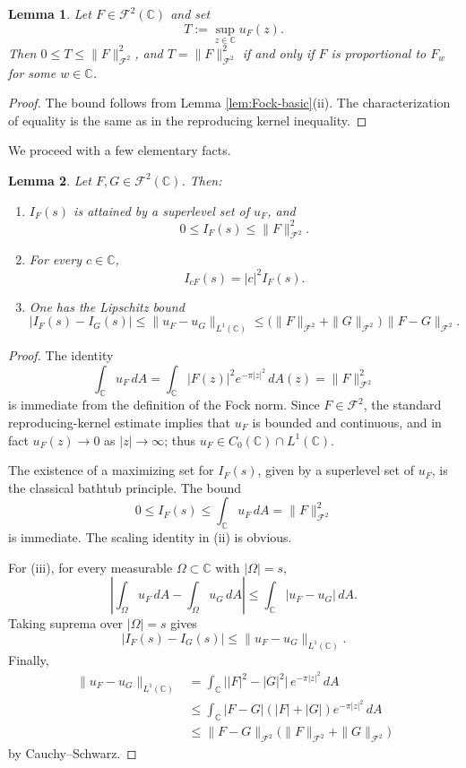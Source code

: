 \documentclass[a4paper,11pt,reqno]{amsart}
\numberwithin{equation}{section}
\theoremstyle{plain} %
\newtheorem{lemma}{Lemma}[section]
\theoremstyle{definition} %
\theoremstyle{remark}
\newcommand{\C}{\mathbb{C}}
\begin{document}
\medskip

\begin{lemma}\label{lem:max}
Let $F \in \mathcal{F}^2(\mathbb{C})$ and set
\[
T := \sup_{z \in \mathbb{C}} u_F(z).
\]
Then $0 \le T \le \|F\|_{\mathcal{F}^2}^2$, and $T = \|F\|_{\mathcal{F}^2}^2$
if and only if $F$ is proportional to $F_w$ for some $w \in \mathbb{C}$.
\end{lemma}

\begin{proof}
The bound follows from Lemma \ref{lem:Fock-basic}(ii). The characterization of
equality is the same as in the reproducing kernel inequality.
    \end{proof}

\medskip

    We proceed with a few elementary facts.

\begin{lemma}\label{lem:basic-properties-global}
Let \(F,G\in \mathcal F^2(\C)\). Then:
\begin{enumerate}
    \item[(i)] \(I_F(s)\) is attained by a superlevel set of \(u_F\), and
    \[
    0\le I_F(s)\le \|F\|_{\mathcal F^2}^2.
    \]
    \item[(ii)] For every \(c\in \C\),
    \[
    I_{cF}(s)=|c|^2 I_F(s).
    \]
    \item[(iii)] One has the Lipschitz bound
    \[
    |I_F(s)-I_G(s)|
    \le
    \|u_F-u_G\|_{L^1(\C)}
    \le
    \big(\|F\|_{\mathcal F^2}+\|G\|_{\mathcal F^2}\big)\,
    \|F-G\|_{\mathcal F^2}.
    \]
\end{enumerate}
\end{lemma}

\begin{proof}
The identity
\[
\int_\C u_F\,dA=\int_\C |F(z)|^2e^{-\pi |z|^2}\,dA(z)=\|F\|_{\mathcal F^2}^2
\]
is immediate from the definition of the Fock norm. Since \(F\in\mathcal F^2\),
the standard reproducing-kernel estimate implies that \(u_F\) is bounded and
continuous, and in fact \(u_F(z)\to 0\) as \(|z|\to \infty\); thus
\(u_F\in C_0(\C)\cap L^1(\C)\).

The existence of a maximizing set for \(I_F(s)\), given by a superlevel set of
\(u_F\), is the classical bathtub principle. The bound
\[
0\le I_F(s)\le \int_\C u_F\,dA=\|F\|_{\mathcal F^2}^2
\]
is immediate. The scaling identity in (ii) is obvious.

For (iii), for every measurable \(\Omega\subset \C\) with \(|\Omega|=s\),
\[
\left|\int_\Omega u_F\,dA-\int_\Omega u_G\,dA\right|
\le \int_\C |u_F-u_G|\,dA.
\]
Taking suprema over \(|\Omega|=s\) gives
\[
|I_F(s)-I_G(s)|\le \|u_F-u_G\|_{L^1(\C)}.
\]
Finally,
\begin{align*}
\|u_F-u_G\|_{L^1(\C)}
&=
\int_\C \big||F|^2-|G|^2\big|\,e^{-\pi |z|^2}\,dA \\
&\le
\int_\C |F-G|(|F|+|G|)e^{-\pi |z|^2}\,dA \\
&\le
\|F-G\|_{\mathcal F^2}\big(\|F\|_{\mathcal F^2}+\|G\|_{\mathcal F^2}\big)
\end{align*}
by Cauchy--Schwarz.
\end{proof}
\end{document}
